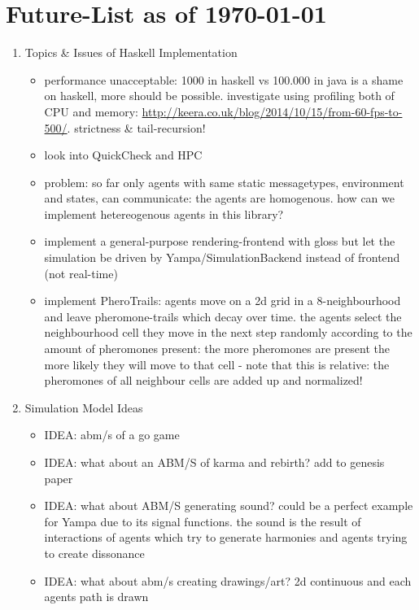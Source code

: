 \section{Future-List as of \today}
\begin{enumerate}
\item Topics \& Issues of Haskell Implementation
	\begin{itemize}
		\item performance unacceptable: 1000 in haskell vs 100.000 in java is a shame on haskell, more should be possible. investigate using profiling both of CPU and memory: \url{http://keera.co.uk/blog/2014/10/15/from-60-fps-to-500/}. strictness \& tail-recursion!	
		\item look into QuickCheck and HPC
		\item problem: so far only agents with same static messagetypes, environment and states, can communicate: the agents are homogenous. how can we implement hetereogenous agents in this library?
		\item implement a general-purpose rendering-frontend with gloss but let the simulation be driven by Yampa/SimulationBackend instead of frontend (not real-time)
		\item implement PheroTrails: agents move on a 2d grid in a 8-neighbourhood and leave pheromone-trails which decay over time. the agents select the neighbourhood cell they move in the next step randomly according to the amount of pheromones present: the more pheromones are present the more likely they will move to that cell - note that this is relative: the pheromones of all neighbour cells are added up and normalized!

	\end{itemize}
	
\item Simulation Model Ideas
	\begin{itemize}
		\item IDEA: abm/s of a go game
		\item IDEA: what about an ABM/S of karma and rebirth? add to genesis paper
		\item IDEA: what about ABM/S generating sound? could be a perfect example for Yampa due to its signal functions. the sound is the result of interactions of agents which try to generate harmonies and agents trying to create dissonance
		\item IDEA: what about abm/s creating drawings/art? 2d continuous and each agents path is drawn

	\end{itemize}
\end{enumerate} 
